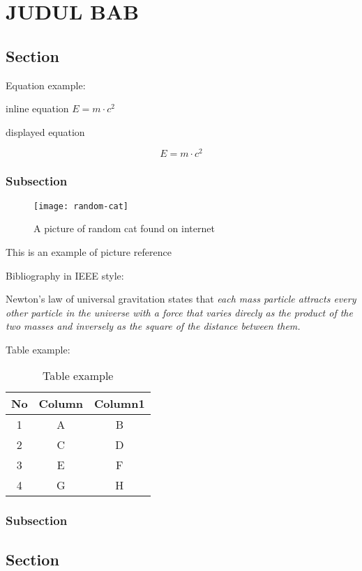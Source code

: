 \chapter{JUDUL BAB}
\section{Section}
\lipsum[1]
Equation example:

inline equation $E=m\cdot c^2$

displayed equation

\begin{equation}
    E=m\cdot c^2
\end{equation}

\subsection{Subsection}

\begin{figure}[H]
    \centering
    \texttt{[image: random-cat]}
    \caption{A picture of random cat found on internet}\label{random-cat}
\end{figure}

This is an example of picture reference~

Bibliography in IEEE style:

Newton's law of universal gravitation states that \textit{each mass particle attracts every other particle in the universe with a force that varies direcly as the product of the two masses and inversely as the square of the distance between them.}\cite{book:classical}

Table example:

\begin{table}[H]
    \centering
    \caption{Table example}\label{table1}
    \begin{tabular}{ccc}
        \toprule
        No & Column & Column1 \\
        \midrule
        1  & A      & B       \\
        2  & C      & D       \\
        3  & E      & F       \\
        4  & G      & H       \\
        \bottomrule
    \end{tabular}
\end{table}

\lipsum[1]
\subsection{Subsection}
\lipsum[1]
\section{Section}
\lipsum[2]

